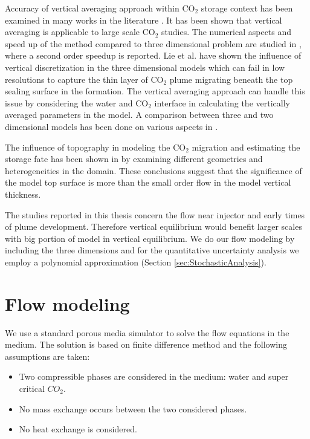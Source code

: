 Accuracy of vertical averaging approach within $\mbox{CO}_2$ storage context has
been
examined in many works in the literature
\cite{moll2011field,lie2010accurate,class2009benchmark,grayderivation}. It has
been shown that vertical averaging is applicable to large scale $\mbox{CO}_2$
studies. The numerical aspects and speed up of the method compared to three
dimensional problem are studied in
\cite{ligaarden2010numerical,grayderivation}, where a second order
speedup is reported. Lie et al. \cite{lie2010accurate} have shown the
influence of vertical discretization in the three dimensional models which can
fail in low resolutions to capture the thin layer of $\mbox{CO}_2$ plume
migrating beneath the top sealing surface in the formation. The vertical
averaging approach can handle this issue by considering the water and
$\mbox{CO}_2$ interface in calculating the vertically averaged parameters in the
model. A comparison between three and two dimensional models has been done on
various aspects in \cite{moll2011field}.

The influence of topography in modeling the $\mbox{CO}_2$ migration
and estimating the storage fate has been shown in
\cite{syversveenstudy,grayderivation} by examining different geometries and
heterogeneities in the domain. These conclusions suggest that the significance
of the model top surface is more than the small order flow in the model vertical
thickness.

The studies reported in this thesis concern the flow near injector and early
times of plume development. Therefore vertical equilibrium would benefit larger
scales with big portion of model in vertical equilibrium. We do our flow
modeling by including the three dimensions and for the quantitative uncertainty
analysis we employ a polynomial approximation (Section
\ref{sec:StochasticAnalysis}).

\section{Flow modeling}
\label{sec:FolowModeling}

We use a standard porous media simulator to solve the flow equations in the
medium. The solution is based on finite difference method and the following
assumptions are taken:

\begin{itemize}

  \item Two compressible phases are considered in the medium: water and super
critical ${CO}_2$.
  \item No mass exchange occurs between the two considered phases.
  \item No heat exchange is considered.

\end{itemize}

